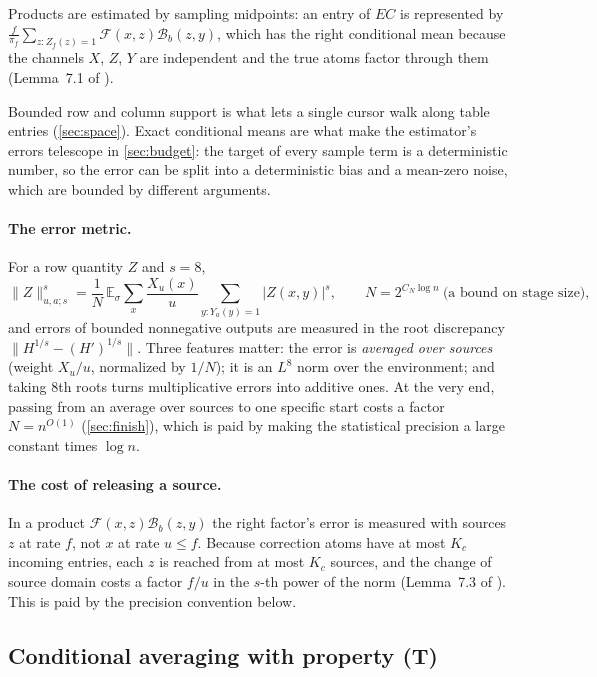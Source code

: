 \documentclass[11pt]{article}
\theoremstyle{definition}
\theoremstyle{remark}
\newcommand{\E}{\mathbb E}
\newcommand{\abs}[1]{\lvert #1\rvert}
\begin{document}
Products are estimated by sampling midpoints: an entry of $EC$ is represented by
$\frac{f}{\pi_f}\sum_{z:Z_f(z)=1}\mathcal F(x,z)\mathcal B_b(z,y)$, which has the
right conditional mean because the channels $X$, $Z$, $Y$ are independent and the
true atoms factor through them (Lemma~7.1 of \cite{OpenAI-BPL}).

\begin{idea}
Bounded row and column support is what lets a single cursor walk along table
entries (\cref{sec:space}). Exact conditional means are what make the
estimator's errors telescope in \cref{sec:budget}: the target of every sample
term is a deterministic number, so the error can be split into a deterministic
bias and a mean-zero noise, which are bounded by different arguments.
\end{idea}

\paragraph{The error metric.} For a row quantity $Z$ and $s=8$,
\[
\|Z\|_{u,a;s}^s=\frac1N\,\E_\sigma\sum_x\frac{X_u(x)}u\sum_{y:Y_a(y)=1}\abs{Z(x,y)}^s,
\qquad N=2^{C_N\log n}\ \text{(a bound on stage size)},
\]
and errors of bounded nonnegative outputs are measured in the root discrepancy
$\|H^{1/s}-(H')^{1/s}\|$. Three features matter: the error is \emph{averaged over
sources} (weight $X_u/u$, normalized by $1/N$); it is an $L^8$ norm over the
environment; and taking $8$th roots turns multiplicative errors into additive
ones. At the very end, passing from an average over sources to one specific start
costs a factor $N=n^{O(1)}$ (\cref{sec:finish}), which is paid by making the
statistical precision a large constant times $\log n$.

\paragraph{The cost of releasing a source.} In a product
$\mathcal F(x,z)\mathcal B_b(z,y)$ the right factor's error is measured with
sources $z$ at rate $f$, not $x$ at rate $u\le f$. Because correction atoms have at
most $K_c$ incoming entries, each $z$ is reached from at most $K_c$ sources, and the
change of source domain costs a factor $f/u$ in the $s$-th power of the norm
(Lemma~7.3 of \cite{OpenAI-BPL}). This is paid by the precision convention below.

\subsection{Conditional averaging with property (T)}\label{sec:averaging}
\end{document}
